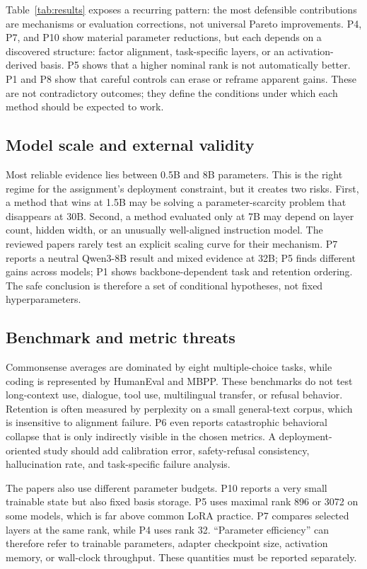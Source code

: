 \documentclass[11pt]{article}
\begin{document}
Table~\ref{tab:results} exposes a recurring pattern: the most defensible contributions are mechanisms or evaluation corrections, not universal Pareto improvements. P4, P7, and P10 show material parameter reductions, but each depends on a discovered structure: factor alignment, task-specific layers, or an activation-derived basis. P5 shows that a higher nominal rank is not automatically better. P1 and P8 show that careful controls can erase or reframe apparent gains. These are not contradictory outcomes; they define the conditions under which each method should be expected to work.

\subsection{Model scale and external validity}

Most reliable evidence lies between 0.5B and 8B parameters. This is the right regime for the assignment's deployment constraint, but it creates two risks. First, a method that wins at 1.5B may be solving a parameter-scarcity problem that disappears at 30B. Second, a method evaluated only at 7B may depend on layer count, hidden width, or an unusually well-aligned instruction model. The reviewed papers rarely test an explicit scaling curve for their mechanism. P7 reports a neutral Qwen3-8B result and mixed evidence at 32B; P5 finds different gains across models; P1 shows backbone-dependent task and retention ordering. The safe conclusion is therefore a set of conditional hypotheses, not fixed hyperparameters.

\subsection{Benchmark and metric threats}

Commonsense averages are dominated by eight multiple-choice tasks, while coding is represented by HumanEval and MBPP. These benchmarks do not test long-context use, dialogue, tool use, multilingual transfer, or refusal behavior. Retention is often measured by perplexity on a small general-text corpus, which is insensitive to alignment failure. P6 even reports catastrophic behavioral collapse that is only indirectly visible in the chosen metrics. A deployment-oriented study should add calibration error, safety-refusal consistency, hallucination rate, and task-specific failure analysis.

The papers also use different parameter budgets. P10 reports a very small trainable state but also fixed basis storage. P5 uses maximal rank 896 or 3072 on some models, which is far above common LoRA practice. P7 compares selected layers at the same rank, while P4 uses rank 32. ``Parameter efficiency'' can therefore refer to trainable parameters, adapter checkpoint size, activation memory, or wall-clock throughput. These quantities must be reported separately.
\end{document}
